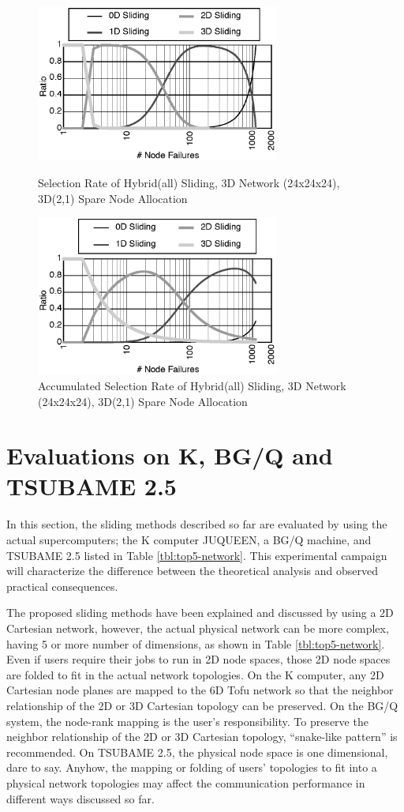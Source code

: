 \documentclass[Afour,times,sagev]{sagej}
\begin{document}
\begin{figure}[ht]
\centering
\includegraphics[width=80mm]{Figs/HYB-24x24x24-Sel.eps}
  \caption{Selection Rate of Hybrid(all) Sliding, 3D Network
    (24x24x24), 3D(2,1) Spare Node Allocation}
\label{fig:sel-rate}
\vspace{5mm}
\includegraphics[width=80mm]{Figs/HYB-24x24x24-SelA.eps}
  \caption{Accumulated Selection Rate of Hybrid(all) Sliding,
    3D Network (24x24x24), 3D(2,1) Spare Node Allocation}
\label{fig:sel-rateA}
\end{figure}

\section{Evaluations on K, BG/Q and TSUBAME 2.5}\label{sec:eval}

In this section, the sliding methods described so far are evaluated by
using the actual supercomputers; the K computer
JUQUEEN\citep{JUQUEEN}, a BG/Q machine, and TSUBAME 2.5
listed in Table \ref{tbl:top5-network}.
This experimental campaign will characterize the difference
between the theoretical analysis and observed practical consequences.

The proposed sliding methods have been explained and discussed by
using a 2D Cartesian network, however, the actual physical network can
be more complex, having 5 or more number of dimensions, as shown in
Table \ref{tbl:top5-network}. Even if users
require their jobs to run in 2D node spaces, those 2D node spaces
are folded to fit in the actual network topologies. On the K computer,
any 2D Cartesian node planes are mapped to the 6D Tofu network so that
the neighbor relationship of the 2D or 3D Cartesian topology can be
preserved. On the BG/Q system, the node-rank mapping is the user's
responsibility. To preserve the neighbor relationship of the 2D or 3D
Cartesian topology, ``snake-like pattern'' is
recommended\citep{BGQ-softdev}. On TSUBAME 2.5, the physical node
space is one dimensional, dare to say. Anyhow, the
mapping or folding of users' topologies to fit into a physical network
topologies may affect the communication performance in different ways
discussed so far.
\end{document}
